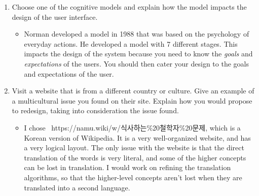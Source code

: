 \documentclass[11pt]{article}
\begin{document}
\begin{enumerate}
    \item Choose one of the cognitive models and explain how the model impacts the design of the user interface. 
    \begin{itemize}
        \item[] Norman developed a model in 1988 that was based on the psychology of everyday actions. He developed a model with 7 different stages. This impacts the design of the system because you
        need to know the \textit{goals} and \textit{expectations} of the users. You should then cater your design to the goals and expectations of the user. 
    \end{itemize}

    \item Visit a website that is from a different country or culture. Give an example of a multicultural 
    issue you found on their site. Explain how you would propose to redesign, taking into consideration the issue found. 
    \begin{itemize}
        \item[] I chose \ https://namu.wiki/w/식사하는\%20철학자\%20문제, which is a Korean version of Wikipedia. It is a very well-organized website, and has a very logical layout. 
        The only issue with the website is that the direct translation of the words is very literal, and some of the higher concepts can be lost in translation. I would work on 
        refining the translation algorithms, so that the higher-level concepts aren't lost when they are translated into a second language.
        
    \end{itemize}
    \end{enumerate}
    
    
\end{document}
